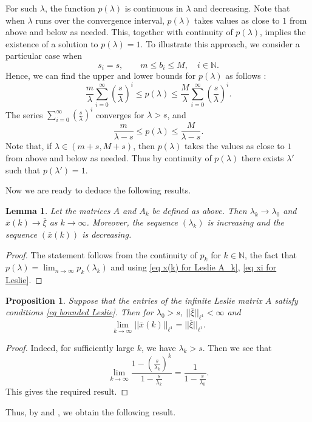 \documentclass[11pt,reqno]{amsart}
\theoremstyle{definition}
\theoremstyle{remark}
\theoremstyle{plain}
\newtheorem{prop}[definition]{Proposition}
\newtheorem{lemma}[definition]{Lemma}
\def\ol{\overline}
\newcommand{\N}{\mathbb N}
\newcommand{\be}{\begin{equation}}
\newcommand{\ee}{\end{equation}}
\numberwithin{equation}{section}
\begin{document}
For such $\lambda$, the function $p(\lambda)$ is continuous in $\lambda$ and decreasing. Note that when $\lambda$ runs over the convergence interval, $p(\lambda)$ takes values as close to $1$ from above and below as needed. This, together with continuity of $p(\lambda)$, implies the existence of a solution to $p(\lambda) = 1 $. To illustrate this approach, we consider a particular case when
\be\label{eq bounded Leslie}
s_i = s,  \qquad m \leq b_i \leq M, \quad  i \in \N.
\ee
Hence, we can find the upper and lower bounds for $p(\lambda)$ as follows :
$$
\frac{m}{\lambda} \sum_{i = 0}^{\infty} \left(\frac{s}{\lambda}\right)^i \leq p(\lambda) \leq  \frac{M}{\lambda} \sum_{i = 0}^{\infty} \left(\frac{s}{\lambda}\right)^i.
$$
The series $\sum_{i = 0}^{\infty} \left(\frac{s}{\lambda}\right)^i$ converges for $\lambda >s$, and
$$
\frac{m}{\lambda -s} \leq p(\lambda) \leq \frac{M}{\lambda -s}.
$$
Note that, if $\lambda \in (m +s, M +s)$, then $p(\lambda)$ takes the values as close to $1$ from above and below as needed. Thus by continuity of $p(\lambda)$ there exists $\lambda'$ such that $p(\lambda') = 1$. 


Now we are ready to deduce the following results. 

\begin{lemma}\label{Lem: Leslie_conv}
Let the matrices $A$ and $A_k$ be defined as above. Then $\lambda_k \to \lambda_0$ and $\ol x(k) \to \ol\xi$ as $k \to \infty$. Moreover, the sequence $(\lambda_k)$ is increasing and 
the sequence $(\ol x(k))$ is decreasing.  
\end{lemma}

\begin{proof} The statement follows from the continuity of $p_k$ for $k \in \N$, the fact that $p(\lambda) = \lim_{n\to \infty} p_k (\lambda_k)$ and using \eqref{eq x(k) for Leslie A_k}, \eqref{eq xi for Leslie}.
\end{proof}

\begin{prop}\label{Prop norm conv Leslie} 
Suppose that the entries of the infinite Leslie matrix $A$ satisfy conditions \eqref{eq bounded Leslie}. Then for $\lambda_0 > s$, $|| \ol \xi||_{\ell^1} < \infty$ and 
$$
\lim_{k\to \infty}|| \ol x(k)||_{\ell^1} = || \ol \xi||_{\ell^1}.
$$
\end{prop}

\begin{proof}
Indeed, for sufficiently large $k$, we have $\lambda_k > s$. 
Then we see that 
$$
\lim_{k\to \infty} \frac{1 - (\frac{s}{\lambda_k})^k}{1 - \frac{s}{\lambda_k} } = \frac{1}{1 - \frac{s}{\lambda_0}}.
$$
This gives the required result.
\end{proof}
Thus, by  and , we obtain the following result.
\end{document}
